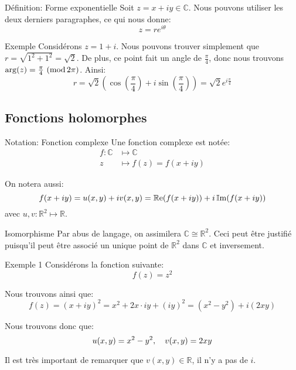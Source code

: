 \documentclass[a4paper]{article}
\begin{document}
\begin{parag}{Définition: Forme exponentielle}
    Soit $z = x + iy \in \mathbb{C}$. Nous pouvons utiliser les deux derniers paragraphes, ce qui nous donne:
    \[z = r e^{i \theta}\]
\end{parag}

\begin{parag}{Exemple}
    Considérons $z = 1 + i$. Nous pouvons trouver simplement que $r = \sqrt{1^2 + 1^2} = \sqrt{2}$. De plus, ce point fait un angle de $\frac{\pi}{4}$, donc nous trouvons $\arg\left(z\right) = \frac{\pi}{4}\ \left(\Mod 2\pi\right)$. Ainsi: 
    \[r = \sqrt{2}\left(\cos\left(\frac{\pi}{4}\right) + i\sin\left(\frac{\pi}{4}\right)\right) = \sqrt{2} e^{i \frac{\pi}{4}}\]
\end{parag}

\subsection{Fonctions holomorphes}
\begin{parag}{Notation: Fonction complexe}
    Une fonction complexe est notée:
    \[\begin{split}
    f: \mathbb{C} &\longmapsto \mathbb{C} \\
    z &\longmapsto f\left(z\right) = f\left(x + iy\right)
    \end{split}\]
    
    On notera aussi:
    \[f\left(x + iy\right) = u\left(x, y\right) + iv\left(x, y\right) = \cre\left(f\left(x + iy\right)\right) + i \cim\left(f\left(x + iy\right)\right)\]
    avec $u, v : \mathbb{R}^2 \mapsto \mathbb{R}$.
\end{parag}

\begin{parag}{Isomorphisme}
    Par abus de langage, on assimilera $\mathbb{C} \cong \mathbb{R}^2$. Ceci peut être justifié puisqu'il peut être associé un unique point de $\mathbb{R}^2$ dans $\mathbb{C}$ et inversement.
\end{parag}

\begin{parag}{Exemple 1}
    Considérons la fonction suivante: 
    \[f\left(z\right) = z^2\]
    
    Nous trouvons ainsi que: 
    \[f\left(z\right) = \left(x + iy\right)^2 = x^2 + 2x \cdot iy + \left(iy\right)^2 = \left(x^2 - y^2\right) + i\left(2xy\right)\]
    
    Nous trouvons donc que: 
    \[u\left(x, y\right) = x^2 - y^2, \mathspace v\left(x, y\right) = 2xy\]

    Il est très important de remarquer que $v\left(x, y\right) \in \mathbb{R}$, il n'y a pas de $i$.
\end{parag}
\end{document}
